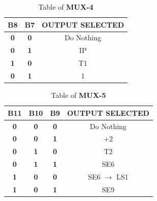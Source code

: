 \documentclass{article}
\begin{document}
\begin{table}[htb]
\centering
\begin{tabular}{|c|c|c|}
\hline
\rowcolor[HTML]{FFFC9E} 
\textbf{B8}                       & \textbf{B7}                       & \textbf{OUTPUT   SELECTED}        \\ \hline
{\color[HTML]{680100} \textbf{0}} & {\color[HTML]{680100} \textbf{0}} & {\color[HTML]{013300} Do Nothing} \\ \hline
{\color[HTML]{680100} \textbf{0}} & {\color[HTML]{680100} \textbf{1}} & {\color[HTML]{013300} IP}         \\ \hline
{\color[HTML]{680100} \textbf{1}} & {\color[HTML]{680100} \textbf{0}} & {\color[HTML]{013300} T1}         \\ \hline
{\color[HTML]{680100} \textbf{0}} & {\color[HTML]{680100} \textbf{1}} & {\color[HTML]{013300} 1}          \\ \hline
\end{tabular}
\caption{Table of \textbf{MUX-4}}
\end{table}

\begin{table}[htb]
\centering
\begin{tabular}{|c|c|c|c|}
\hline
\rowcolor[HTML]{FFFC9E} 
\textbf{B11}                      & \textbf{B10}                      & \textbf{B9}                       & \textbf{OUTPUT   SELECTED}         \\ \hline
{\color[HTML]{680100} \textbf{0}} & {\color[HTML]{680100} \textbf{0}} & {\color[HTML]{680100} \textbf{0}} & {\color[HTML]{013300} Do Nothing}  \\ \hline
{\color[HTML]{680100} \textbf{0}} & {\color[HTML]{680100} \textbf{0}} & {\color[HTML]{680100} \textbf{1}} & {\color[HTML]{013300} +2}          \\ \hline
{\color[HTML]{680100} \textbf{0}} & {\color[HTML]{680100} \textbf{1}} & {\color[HTML]{680100} \textbf{0}} & {\color[HTML]{013300} T2}          \\ \hline
{\color[HTML]{680100} \textbf{0}} & {\color[HTML]{680100} \textbf{1}} & {\color[HTML]{680100} \textbf{1}} & {\color[HTML]{013300} SE6}         \\ \hline
{\color[HTML]{680100} \textbf{1}} & {\color[HTML]{680100} \textbf{0}} & {\color[HTML]{680100} \textbf{0}} & {\color[HTML]{013300} SE6 $\rightarrow$   LS1} \\ \hline
{\color[HTML]{680100} \textbf{1}} & {\color[HTML]{680100} \textbf{0}} & {\color[HTML]{680100} \textbf{1}} & {\color[HTML]{013300} SE9}         \\ \hline
\end{tabular}
\caption{Table of \textbf{MUX-5}}
\end{table}
\end{document}
